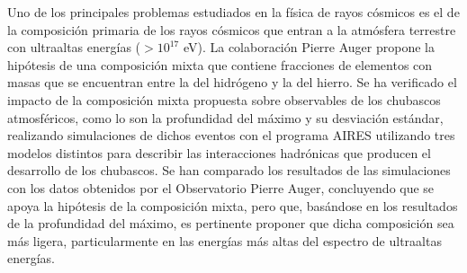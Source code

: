 

Uno de los principales problemas estudiados en la física de rayos cósmicos es el de la composición primaria de los rayos cósmicos que entran a la atmósfera terrestre con ultraaltas energías ($>10^{17}$ eV). La colaboración Pierre Auger propone la hipótesis de una composición mixta que contiene fracciones de elementos con masas que se encuentran entre la del hidrógeno y la del hierro. Se ha verificado el impacto de la composición mixta propuesta sobre observables de los chubascos atmosféricos, como lo son la profundidad del máximo y su desviación estándar, realizando simulaciones de dichos eventos con el programa AIRES utilizando tres modelos distintos para describir las interacciones hadrónicas que producen el desarrollo de los chubascos. Se han comparado los resultados de las simulaciones con los datos obtenidos por el Observatorio Pierre Auger, concluyendo que se apoya la hipótesis de la composición mixta, pero que, basándose en los resultados de la profundidad del máximo, es pertinente proponer que dicha composición sea más ligera, particularmente en las energías más altas del espectro de ultraaltas energías.


\singlespacing